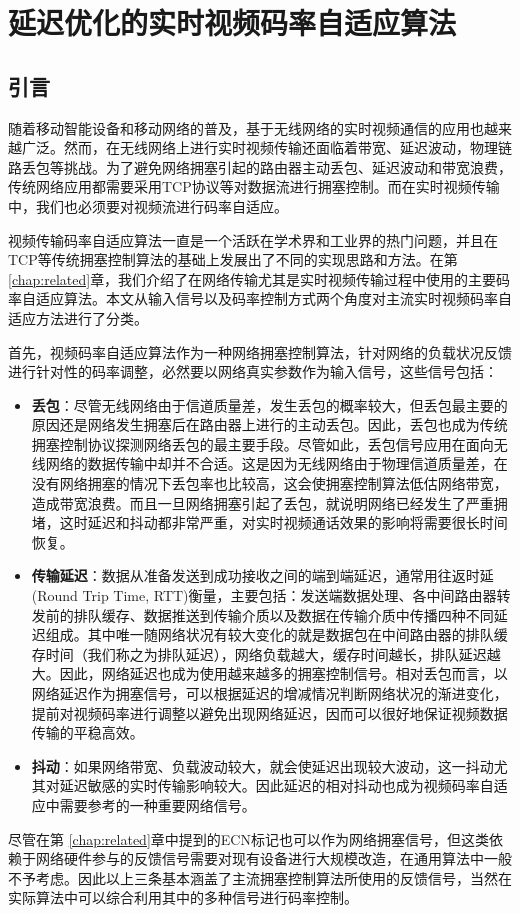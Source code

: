 \chapter{延迟优化的实时视频码率自适应算法}
\label{chap:rate}

\section{引言}
随着移动智能设备和移动网络的普及，基于无线网络的实时视频通信的应用也越来越广泛。然而，在无线网络上进行实时视频传输还面临着带宽、延迟波动，物理链路丢包等挑战。为了避免网络拥塞引起的路由器主动丢包、延迟波动和带宽浪费，传统网络应用都需要采用TCP协议等对数据流进行拥塞控制。而在实时视频传输中，我们也必须要对视频流进行码率自适应。

视频传输码率自适应算法一直是一个活跃在学术界和工业界的热门问题，并且在TCP等传统拥塞控制算法的基础上发展出了不同的实现思路和方法。在第 \ref{chap:related}章，我们介绍了在网络传输尤其是实时视频传输过程中使用的主要码率自适应算法。本文从输入信号以及码率控制方式两个角度对主流实时视频码率自适应方法进行了分类。

首先，视频码率自适应算法作为一种网络拥塞控制算法，针对网络的负载状况反馈进行针对性的码率调整，必然要以网络真实参数作为输入信号，这些信号包括：
\begin{itemize}
    \item \textbf{丢包}：尽管无线网络由于信道质量差，发生丢包的概率较大，但丢包最主要的原因还是网络发生拥塞后在路由器上进行的主动丢包。因此，丢包也成为传统拥塞控制协议探测网络丢包的最主要手段。尽管如此，丢包信号应用在面向无线网络的数据传输中却并不合适。这是因为无线网络由于物理信道质量差，在没有网络拥塞的情况下丢包率也比较高，这会使拥塞控制算法低估网络带宽，造成带宽浪费。而且一旦网络拥塞引起了丢包，就说明网络已经发生了严重拥堵，这时延迟和抖动都非常严重，对实时视频通话效果的影响将需要很长时间恢复。
    \item \textbf{传输延迟}：数据从准备发送到成功接收之间的端到端延迟，通常用往返时延(Round Trip Time, RTT)衡量，主要包括：发送端数据处理、各中间路由器转发前的排队缓存、数据推送到传输介质以及数据在传输介质中传播四种不同延迟组成。其中唯一随网络状况有较大变化的就是数据包在中间路由器的排队缓存时间（我们称之为排队延迟），网络负载越大，缓存时间越长，排队延迟越大。因此，网络延迟也成为使用越来越多的拥塞控制信号。相对丢包而言，以网络延迟作为拥塞信号，可以根据延迟的增减情况判断网络状况的渐进变化，提前对视频码率进行调整以避免出现网络延迟，因而可以很好地保证视频数据传输的平稳高效。
    \item \textbf{抖动}：如果网络带宽、负载波动较大，就会使延迟出现较大波动，这一抖动尤其对延迟敏感的实时传输影响较大。因此延迟的相对抖动也成为视频码率自适应中需要参考的一种重要网络信号。
\end{itemize}
尽管在第 \ref{chap:related}章中提到的ECN标记也可以作为网络拥塞信号，但这类依赖于网络硬件参与的反馈信号需要对现有设备进行大规模改造，在通用算法中一般不予考虑。因此以上三条基本涵盖了主流拥塞控制算法所使用的反馈信号，当然在实际算法中可以综合利用其中的多种信号进行码率控制。

